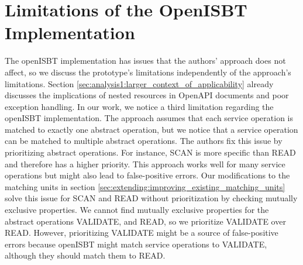 \section{Limitations of the OpenISBT Implementation}
\label{sec:discussion_limitations_implementation}

The openISBT implementation has issues that the authors' approach does not affect, so we discuss the prototype's limitations independently of the approach's limitations. Section \ref{sec:analysis1:larger_context_of_applicability} already discusses the implications of nested resources in OpenAPI documents and poor exception handling. In our work, we notice a third limitation regarding the openISBT implementation. The approach assumes that each service operation is matched to exactly one abstract operation, but we notice that a service operation can be matched to multiple abstract operations. The authors fix this issue by prioritizing abstract operations. For instance, SCAN is more specific than READ and therefore has a higher priority. This approach works well for many service operations but might also lead to false-positive errors. Our modifications to the matching units in section \ref{sec:extending:improving_existing_matching_units} solve this issue for SCAN and READ without prioritization by checking mutually exclusive properties. We cannot find mutually exclusive properties for the abstract operations VALIDATE, and READ, so we prioritize VALIDATE over READ. However, prioritizing VALIDATE might be a source of false-positive errors because openISBT might match service operations to VALIDATE, although they should match them to READ.